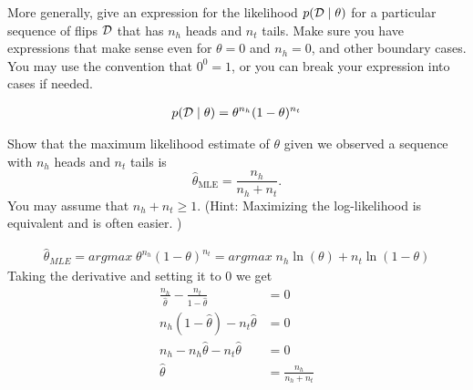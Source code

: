 \documentclass[12pt,letterpaper]{article}
\begin{document}
\begin{problem}{6.3}
    More generally, give an expression for the likelihood
    $p(\mathcal{D}\mid\theta)$ for a particular sequence of flips $\mathcal{D}$ that
    has $n_{h}$ heads and $n_{t}$ tails. Make sure you have expressions
    that make sense even for $\theta=0$ and $n_{h}=0$, and other boundary
    cases. You may use the convention that $0^{0}=1$, or you can break
    your expression into cases if needed.
\end{problem}
\begin{solution}{}
    \begin{align*}
        p(\mathcal{D}\mid\theta) = \theta^{n_h}(1-\theta)^{n_t}
    \end{align*}
\end{solution}
\newpage

\begin{problem}{6.4}
    Show that the maximum likelihood estimate of $\theta$
    given we observed a sequence with $n_{h}$ heads and $n_{t}$ tails
    is
    \[
    \hat{\theta}_{\text{MLE}}=\frac{n_{h}}{n_{h}+n_{t}}.
    \]
    You may assume that $n_{h}+n_{t}\ge1$. (Hint: Maximizing the log-likelihood
    is equivalent and is often easier. )
\end{problem}
\begin{solution}{}
    \begin{align*}
        \hat{\theta}_{MLE} = argmax\; \theta^{n_h}(1-\theta)^{n_t} = argmax\; n_h\ln(\theta) + n_t\ln(1-\theta)
    \end{align*}
    Taking the derivative and setting it to 0 we get
    \begin{align*}
        \frac{n_h}{\hat{\theta}} - \frac{n_t}{1-\hat{\theta}} &= 0\\
        n_h(1-\hat{\theta}) - n_t\hat{\theta} &= 0\\
        n_h - n_h\hat{\theta} - n_t\hat{\theta} &= 0\\
        \hat{\theta} &= \frac{n_h}{n_h+n_t}
    \end{align*}
\end{solution}
\newpage
\end{document}
